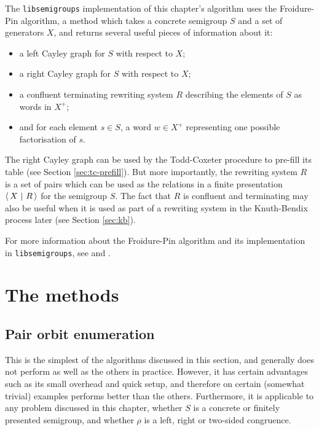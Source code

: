 The \texttt{libsemigroups} implementation of this chapter's algorithm uses the
Froidure-Pin algorithm, a method which takes a concrete semigroup $S$ and a set
of generators $X$, and returns several useful pieces of information about it:
\begin{itemize}
\item a left Cayley graph for $S$ with respect to $X$;
\item a right Cayley graph for $S$ with respect to $X$;
\item a confluent terminating rewriting system $R$ describing the elements of
  $S$ as words in $X^+$;
\item and for each element $s \in S$, a word $w \in X^+$ representing one
  possible factorisation of $s$.
\end{itemize}
The right Cayley graph can be used by the Todd-Coxeter procedure to pre-fill its
table (see Section \ref{sec:tc-prefill}).  But more importantly, the rewriting
system $R$ is a set of pairs which can be used as the relations in a finite
presentation $\left\langle\,X ~\middle|~ R\,\right\rangle$ for the semigroup $S$.  The fact that $R$ is confluent
and terminating may also be useful when it is used as part of a rewriting system
in the Knuth-Bendix process later (see Section \ref{sec:kb}).

For more information about the Froidure-Pin algorithm and its implementation in
\texttt{libsemigroups}, see \cite{froidure-pin} and \cite{froidure-pin-jonusas}.


\section{The methods}

\subsection{Pair orbit enumeration}
\label{sec:p}

This is the simplest of the algorithms discussed in this section, and
generally does not perform as well as the others in practice.  However, it has certain
advantages such as its small overhead and quick setup, and therefore on certain (somewhat
trivial) examples performs better than the others.  Furthermore, it is
applicable to any problem discussed in this chapter, whether $S$ is a concrete
or finitely presented semigroup, and whether $\rho$ is a left, right or
two-sided congruence.

